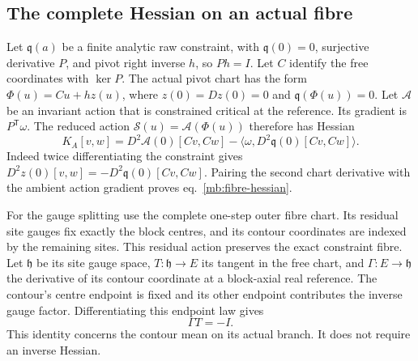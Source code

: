\documentclass[11pt,letterpaper,reqno]{amsart}
\numberwithin{equation}{section}
\renewcommand{\eqref}[1]{\textup{eq.~\ref{#1}}}
\theoremstyle{definition}
\theoremstyle{remark}
\begin{document}
\subsection{The complete Hessian on an actual fibre}

Let $\mathfrak q(a)$ be a finite analytic raw constraint, with
$\mathfrak q(0)=0$, surjective derivative $P$, and pivot right
inverse $h$, so $Ph=I$. Let $C$ identify the free coordinates
with $\ker P$. The actual pivot chart has the form
$\Phi(u)=Cu+hz(u)$, where $z(0)=Dz(0)=0$ and
$\mathfrak q(\Phi(u))=0$.
Let $\mathcal A$ be an invariant action that is constrained
critical at the reference. Its gradient is $P^{\mathsf T}\omega$.
The reduced action $\mathcal S(u)=\mathcal A(\Phi(u))$ therefore
has Hessian
\begin{equation}\label{mb:fibre-hessian}
 K_A[v,w]=D^2\mathcal A(0)[Cv,Cw]
               -\langle\omega,D^2\mathfrak q(0)[Cv,Cw]\rangle.
\end{equation}
Indeed twice differentiating the constraint gives
$D^2z(0)[v,w]=-D^2\mathfrak q(0)[Cv,Cw]$. Pairing the
second chart derivative with the ambient action gradient proves
\eqref{mb:fibre-hessian}.

For the gauge splitting use the complete one-step outer
fibre chart. Its residual site gauges fix exactly the block
centres, and its contour coordinates are indexed by the
remaining sites. This residual action preserves the exact
constraint fibre. Let $\mathfrak h$ be its site gauge space,
$T:\mathfrak h\to E$ its tangent in the free chart, and
$\Gamma:E\to\mathfrak h$ the derivative of its contour
coordinate at a block-axial real reference. The contour's
centre endpoint is fixed and its other endpoint contributes
the inverse gauge factor. Differentiating this endpoint law gives
\begin{equation}\label{mb:gauge-tangent-readout}
                              \Gamma T=-I.
\end{equation}
This identity concerns the contour mean on its actual branch.
It does not require an inverse Hessian.
\end{document}

